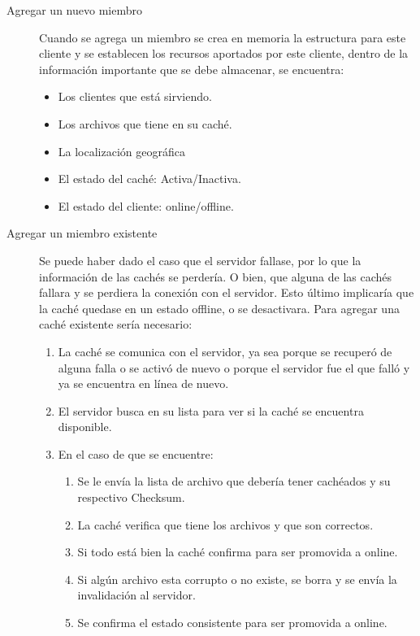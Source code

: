 \begin{description}
\item[Agregar un nuevo miembro] Cuando se agrega un miembro se crea en memoria la estructura para este cliente y se establecen los recursos aportados por este cliente, dentro de la información importante que se debe almacenar, se encuentra:
	\begin{itemize}
	\item Los clientes que está sirviendo.
	\item Los archivos que tiene en su caché.
	\item La localización geográfica 
	\item El estado del caché: Activa/Inactiva.
	\item El estado del cliente: online/offline.
	\end{itemize}
	
\item [Agregar un miembro existente] Se puede haber dado el caso que el servidor fallase, por lo que la información de las cachés se perdería. O bien, que alguna de las cachés fallara y se perdiera la conexión con el servidor. Esto último implicaría que la caché quedase en un estado offline, o se desactivara. Para agregar una caché existente sería necesario:

	\begin{enumerate}
	\item La caché se comunica con el servidor, ya sea porque se recuperó de alguna falla o se activó de nuevo o porque el servidor fue el que falló y ya se encuentra en línea de nuevo.
	\item El servidor busca en su lista para ver si la caché se encuentra disponible.
	\item En el caso de que se encuentre:

		\begin{enumerate}
		\item Se le envía la lista de archivo que debería tener cachéados y su respectivo Checksum.
		\item La caché verifica que tiene los archivos y que son correctos.
		\item Si todo está bien la caché confirma para ser promovida a online.
		\item Si algún archivo esta corrupto o no existe, se borra y se envía la invalidación al servidor.
		\item Se confirma el estado consistente para ser promovida a online.
		\end{enumerate}	
	

\end{enumerate}
\end{description}
